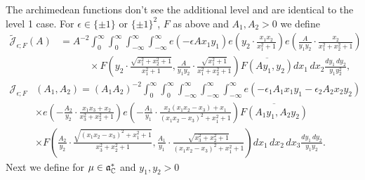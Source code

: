 \documentclass[11pt]{amsart}
\theoremstyle{plain}
\numberwithin{equation}{section}
\theoremstyle{definition}
\begin{document}
 
The archimedean functions don't see the additional level and are identical to  the level 1 case.  For $\epsilon \in \{\pm 1\}$ or $\{\pm 1\}^2$,  $F$ as above and $A_1, A_2 > 0$ we define
\begin{equation}\label{test1}
\begin{split}
  \tilde{\mathcal{J}}_{\epsilon;F}(A) & =  A^{-2} \int_0^{\infty}\int_0^{\infty} \int_{-\infty}^{\infty}\int_{-\infty}^{\infty}   e(-\epsilon Ax_1y_1) e\left(y_2 \cdot \frac{x_1x_2}{x_1^2 + 1}\right) e\left(\frac{A}{y_1y_2} \cdot \frac{x_2}{x_1^2 + x_2^2 + 1}\right) \\
& \quad\quad\quad \times F\left(y_2 \cdot \frac{\sqrt{x_1^2+x_2^2 + 1}}{x_1^2 + 1}, \frac{A}{y_1y_2}\cdot \frac{\sqrt{x_1^2 + 1}}{x_1^2+x_2^2 + 1}\right) \overline{F(Ay_1, y_2)} dx_1\, dx_2 \frac{dy_1\, dy_2}{y_1y_2^2},
\end{split}  
\end{equation}
\begin{equation}\label{test2}
\begin{split}
  \mathcal{J}_{\epsilon; F}& (A_1, A_2) =  (A_1A_2)^{-2} \int_0^{\infty}\int_0^{\infty} \int_{-\infty}^{\infty}\int_{-\infty}^{\infty}\int_{-\infty}^{\infty} e\left(-\epsilon_1 A_1x_1y_1 - \epsilon_2 A_2x_2y_2\right)\\
 & \times  e\left(-\frac{A_2}{y_2} \cdot \frac{x_1x_3+x_2}{x_3^2 + x_2^2 + 1}\right) e\left(-\frac{A_1}{y_1} \cdot \frac{x_2(x_1x_2-x_3) + x_1} {(x_1x_2-x_3)^2 + x_1^2 + 1}\right)\overline{F(A_1y_1, A_2 y_2)} \\
& \times F\left(\frac{A_2}{y_2} \cdot \frac{\sqrt{(x_1x_2-x_3)^2 + x_1^2 + 1}}{x_3^2 + x_2^2 + 1}, \frac{A_1}{y_1} \cdot \frac{ \sqrt{x_3^2 + x_2^2 + 1}} {(x_1x_2-x_3)^2 + x_1^2 + 1}\right)  dx_1\, dx_2\, dx_3 \frac{dy_1\, dy_2}{y_1y_2}.
\end{split}  
\end{equation}
Next we define for $\mu \in \mathfrak{a}_{\Bbb{C}}^{\ast}$ and $y_1, y_2 > 0$ %
\end{document}
